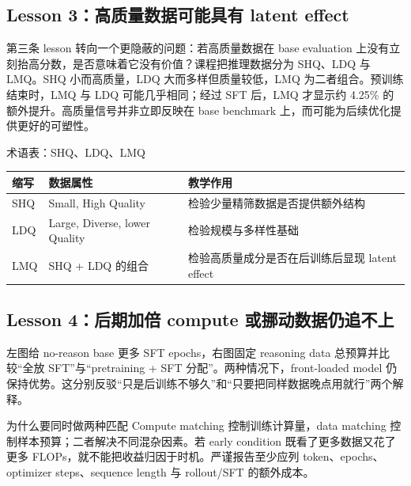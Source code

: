 
\subsection{Lesson 3：高质量数据可能具有 latent effect}

第三条 lesson 转向一个更隐蔽的问题：若高质量数据在 base evaluation 上没有立刻抬高分数，是否意味着它没有价值？课程把推理数据分为 SHQ、LDQ 与 LMQ。SHQ 小而高质量，LDQ 大而多样但质量较低，LMQ 为二者组合。预训练结束时，LMQ 与 LDQ 可能几乎相同；经过 SFT 后，LMQ 才显示约 4.25\% 的额外提升。高质量信号并非立即反映在 base benchmark 上，而可能为后续优化提供更好的可塑性。


\begin{knowledgebox}{术语表：SHQ、LDQ、LMQ}
\begin{tabularx}{\textwidth}{L{0.16\textwidth}L{0.23\textwidth}X}
\toprule
缩写 & 数据属性 & 教学作用 \\
\midrule
SHQ & Small, High Quality & 检验少量精筛数据是否提供额外结构 \\
LDQ & Large, Diverse, lower Quality & 检验规模与多样性基础 \\
LMQ & SHQ + LDQ 的组合 & 检验高质量成分是否在后训练后显现 latent effect \\
\bottomrule
\end{tabularx}
\end{knowledgebox}

\subsection{Lesson 4：后期加倍 compute 或挪动数据仍追不上}

左图给 no-reason base 更多 SFT epochs，右图固定 reasoning data 总预算并比较“全放 SFT”与“pretraining + SFT 分配”。两种情况下，front-loaded model 仍保持优势。这分别反驳“只是后训练不够久”和“只要把同样数据晚点用就行”两个解释。


\begin{importantbox}{为什么要同时做两种匹配}
Compute matching 控制训练计算量，data matching 控制样本预算；二者解决不同混杂因素。若 early condition 既看了更多数据又花了更多 FLOPs，就不能把收益归因于时机。严谨报告至少应列 token、epochs、optimizer steps、sequence length 与 rollout/SFT 的额外成本。
\end{importantbox}

